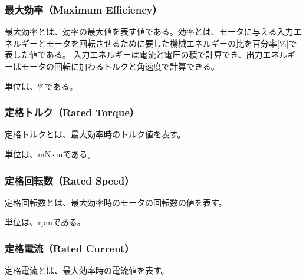 \subsubsection{最大効率（Maximum Efficiency）}\label{sub:sub:saidaikouritu}
最大効率とは、効率の最大値を表す値である。効率とは、モータに与える入力エネルギーとモータを回転させるために要した機械エネルギーの比を百分率[\%]で表した値である。
入力エネルギーは電流と電圧の積で計算でき、出力エネルギーはモータの回転に加わるトルクと角速度で計算できる。

単位は、$\mathrm{\%}$である。
\subsubsection{定格トルク（Rated Torque）}\label{sub:sub:teikakutoruku}
定格トルクとは、最大効率時のトルク値を表す。

単位は、$\mathrm{mN \cdot m}$である。
\subsubsection{定格回転数（Rated Speed）}\label{sub:sub:teikakukaiten}
定格回転数とは、最大効率時のモータの回転数の値を表す。

単位は、$\mathrm{rpm}$である。

\subsubsection{定格電流（Rated Current）}\label{sub:sub:teikakuden}
定格電流とは、最大効率時の電流値を表す。

